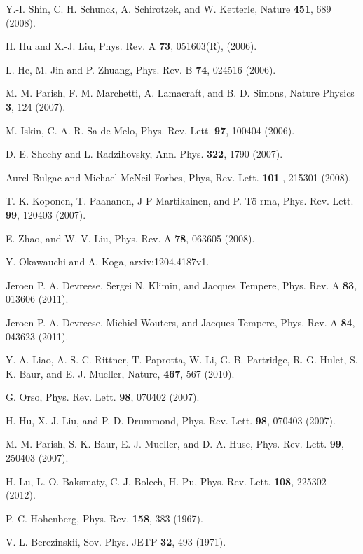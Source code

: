 \documentclass[prl,showpacs,twocolumn]{revtex4}
\begin{document}
\begin{thebibliography}{99}
 Y.-I. Shin, C. H. Schunck, A. Schirotzek, and W. Ketterle,
Nature \textbf{451}, 689 (2008).

 H. Hu and X.-J. Liu, Phys. Rev. A \textbf{73}, 051603(R),
(2006).

 L. He, M. Jin and P. Zhuang, Phys. Rev. B \textbf{74}, 024516
(2006).

 M. M. Parish, F. M. Marchetti, A. Lamacraft, and B. D.
Simons, Nature Physics \textbf{3}, 124 (2007).

 M. Iskin, C. A. R. Sa de Melo, Phys. Rev. Lett. \textbf{97},
100404 (2006).

 D. E. Sheehy and L. Radzihovsky, Ann. Phys. \textbf{322},
1790 (2007).

 Aurel Bulgac and Michael McNeil Forbes, Phys, Rev. Lett. \textbf{101%
}, 215301 (2008).

 T. K. Koponen, T. Paananen, J-P Martikainen, and P. T\"{o}%
rma, Phys. Rev. Lett. \textbf{99}, 120403 (2007).

 E. Zhao, and W. V. Liu, Phys. Rev. A \textbf{78}, 063605
(2008).

 Y. Okawauchi and A. Koga, arxiv:1204.4187v1.

 Jeroen P. A. Devreese, Sergei N. Klimin, and Jacques
Tempere, Phys. Rev. A \textbf{83}, 013606 (2011).

 Jeroen P. A. Devreese, Michiel Wouters, and Jacques
Tempere, Phys. Rev. A \textbf{84}, 043623 (2011).

 Y.-A. Liao, A. S. C. Rittner, T. Paprotta, W. Li, G. B.
Partridge, R. G. Hulet, S. K. Baur, and E. J. Mueller, Nature, \textbf{467},
567 (2010).

 G. Orso, Phys. Rev. Lett. \textbf{98}, 070402 (2007).

 H. Hu, X.-J. Liu, and P. D. Drummond, Phys. Rev. Lett. \textbf{%
98}, 070403 (2007).

 M. M. Parish, S. K. Baur, E. J. Mueller, and D. A. Huse,
Phys. Rev. Lett. \textbf{99}, 250403 (2007).

 H. Lu, L. O. Baksmaty, C. J. Bolech, H. Pu, Phys. Rev. Lett.
\textbf{108}, 225302 (2012).

 P. C. Hohenberg, Phys. Rev. \textbf{158}, 383 (1967).

 V. L. Berezinskii, Sov. Phys. JETP \textbf{32}, 493 (1971).


\end{thebibliography}
\end{document}
